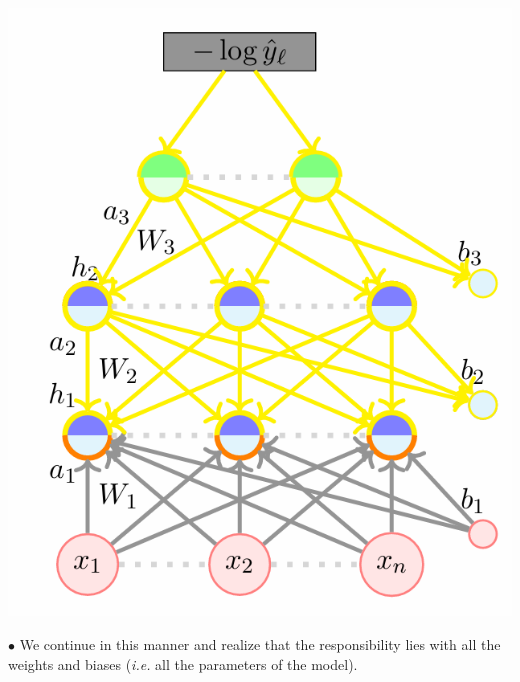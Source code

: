 \documentclass[11pt, a4paper]{article}
\begin{document}
\noindent
\begin{minipage}{0.45\textwidth}
    \includegraphics[scale = 0.49]{image_7.png}
\end{minipage}
\hfill
\begin{minipage}{0.5\textwidth}
    $\bullet$ We continue in this manner and realize that the responsibility lies with all the weights and biases (\textit{i.e.} all the parameters of the model).
\end{minipage}
\end{document}
